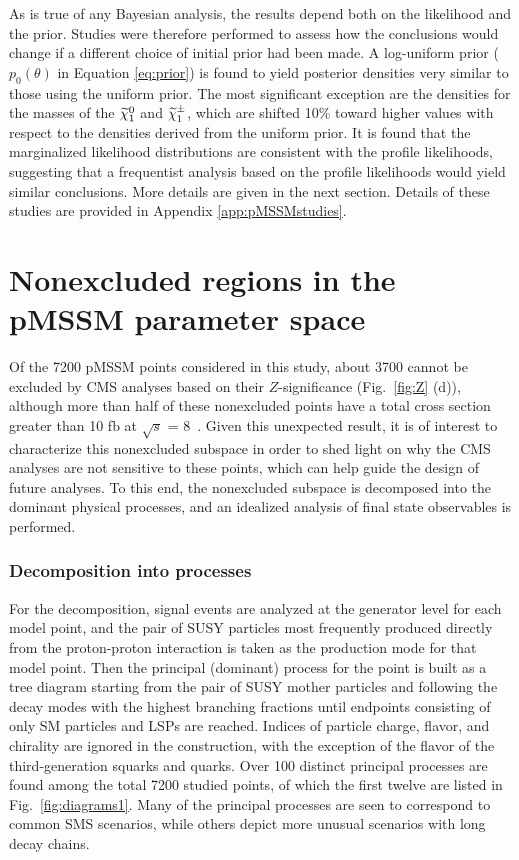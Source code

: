 As is true of any Bayesian analysis, the results depend both on the likelihood and the prior. Studies were therefore performed to assess how the conclusions would change if a 
different choice of initial prior had been made. A log-uniform prior ($p_0(\theta)$ in Equation \ref{eq:prior}) is found to yield posterior densities very similar to those using the uniform prior. The most significant exception are 
the densities for the masses of the $\widetilde{\chi}^0_1$ and  $\widetilde{\chi}^\pm_1$, which are shifted 10\% 
toward higher values with respect to the densities derived from the
uniform prior. It is found that the marginalized 
likelihood distributions are consistent with the profile likelihoods, suggesting that a 
frequentist analysis based on the profile likelihoods would yield similar conclusions. More details are given in the next section. Details of these studies are provided in Appendix \ref{app:pMSSMstudies}.
\FloatBarrier

\section{Nonexcluded regions in the pMSSM parameter space}
\label{sec:unexplored}

Of the 7200 pMSSM points considered in this study, about 3700 cannot be
excluded by CMS analyses based on their $Z$-significance (Fig.~\ref{fig:Z} (d)), although more
than half of these nonexcluded points have a total cross section greater than 10 fb at $\sqrt{s}$ = 8~\TeV.
Given this unexpected result, it is of interest to characterize this nonexcluded
subspace in order to shed light on why the CMS analyses are not
sensitive to these points, which can help guide the design of future analyses. To this end, the nonexcluded subspace is decomposed into the dominant physical processes, and an idealized analysis of final state
observables is performed.

\subsubsection{Decomposition into processes}
For the decomposition, signal events are analyzed at the generator
level for each model point, and the pair of SUSY particles most frequently produced directly
from the proton-proton interaction is taken as the production 
mode for that model point. Then the principal (dominant) process for
the point is built as a tree diagram starting from the pair of SUSY mother
particles and following the decay modes with the highest branching
fractions until endpoints consisting of only SM particles
and LSPs are reached. Indices of particle charge, flavor,  and chirality are ignored in the
construction, with the exception of the flavor of the third-generation squarks and quarks.
Over 100 distinct principal processes are found
among the total 7200 studied points, of which the first twelve
are listed in Fig.~\ref{fig:diagrams1}. Many
of the principal processes are seen to correspond to common SMS scenarios, while others
depict more unusual scenarios with long decay chains. 


